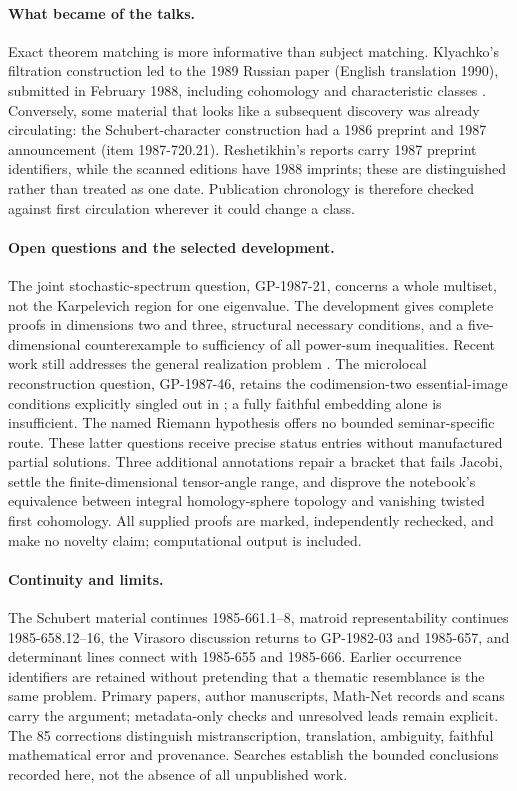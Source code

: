 \paragraph{What became of the talks.}
Exact theorem matching is more informative than subject matching.
Klyachko's filtration construction led to the 1989 Russian paper
(English translation 1990), submitted in February 1988, including
cohomology and characteristic classes
\citep[Sections~2--4]{klyachko1989equivariant}.
Conversely, some material that looks like a subsequent discovery was
already circulating: the Schubert-character construction had a 1986
preprint and 1987 announcement (item 1987-720.21). Reshetikhin's reports
carry 1987 preprint identifiers, while the scanned editions have 1988
imprints; these are distinguished rather than treated as one date.
Publication chronology is therefore checked
against first circulation wherever it could change a class.

\paragraph{Open questions and the selected development.}
The joint stochastic-spectrum question, GP-1987-21, concerns a whole
multiset, not the Karpelevich region for one eigenvalue. The development
gives complete proofs in dimensions two and three, structural necessary
conditions, and a five-dimensional counterexample to sufficiency of
all power-sum inequalities. Recent work still addresses the general
realization problem \citep{johnsonpaparella2025perron}.
The microlocal reconstruction question, GP-1987-46, retains the
codimension-two essential-image conditions explicitly singled out in
\citet[Problem~9.3]{kashiwaravilonen2014codimension}; a fully faithful
embedding alone is insufficient. The named Riemann hypothesis offers
no bounded seminar-specific route. These latter questions receive
precise status entries without manufactured partial solutions.
Three additional annotations repair a bracket that fails Jacobi,
settle the finite-dimensional tensor-angle range, and disprove the
notebook's equivalence between integral
homology-sphere topology and vanishing twisted first cohomology.
All supplied proofs are marked, independently rechecked, and make no
novelty claim; computational output is included.

\paragraph{Continuity and limits.}
The Schubert material continues 1985-661.1--8, matroid representability
continues 1985-658.12--16, the Virasoro discussion returns to
GP-1982-03 and 1985-657, and determinant lines connect with
1985-655 and 1985-666. Earlier occurrence identifiers are retained
without pretending that a thematic resemblance is the same problem.
Primary papers, author manuscripts, Math-Net records and scans carry
the argument; metadata-only checks and unresolved leads remain
explicit. The 85 corrections distinguish mistranscription,
translation, ambiguity, faithful mathematical error and provenance.
Searches establish the bounded conclusions recorded here, not the
absence of all unpublished work.

